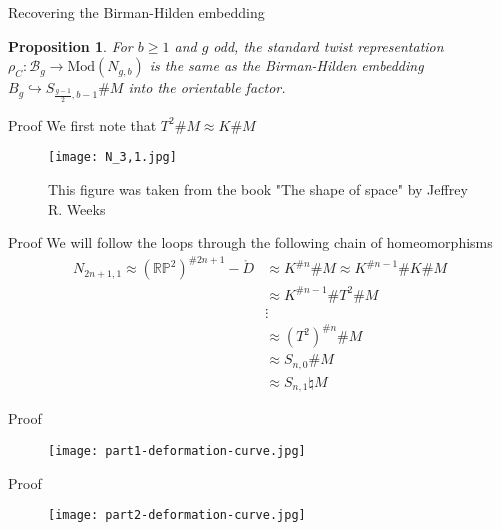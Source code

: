 \documentclass{beamer}
\newtheorem{prop}[thm]{Proposition}
\theoremstyle{definition}
\theoremstyle{remark}
\newcommand{\Mod}{{\mathrm{Mod}}}
\begin{document}
\begin{frame}{Recovering the
Birman-Hilden embedding}
    \begin{prop}
        For $b\geq 1$ and $g$ odd,
        the standard twist representation
        $\rho_C \colon \mathcal{B}_g
        \to \Mod(N_{g,b})$ is the
        same as the Birman-Hilden embedding $B_g \hookrightarrow
        S_{\frac{g-1}{2},b-1} 
        \# M$ into the orientable
        factor.
    \end{prop}
\end{frame}

\begin{frame}{Proof}
    We first note that
    $T^2 \# M \approx
    K \# M$



    \begin{figure}
        \centering
        \texttt{[image: N\_3,1.jpg]}
        \caption{This figure was taken from the book "The shape of space" by Jeffrey R. Weeks}
        \label{fig:enter-label}
    \end{figure}
\end{frame}

\begin{frame}{Proof}
We will follow the loops through
the following chain of
homeomorphisms
    \begin{align*}
N_{2n+1,1} \approx
\left( \mathbb{R}\mathbb{P}^2 \right)^{\# 2n+1} -
\mathring{D} 
&\approx K^{\# n} \# M
\approx K^{\# n-1} \# K \# M\\
&\approx K^{\# n-1} \# T^2 \# M\\
&\vdots\\
&\approx \left( T^2 \right)^{\# n} \# M\\
&\approx S_{n,0} \# M\\
&\approx S_{n,1} \natural M
\end{align*}
\end{frame}

\begin{frame}{Proof}
    \begin{figure}
        \centering
        \texttt{[image: part1-deformation-curve.jpg]}
        \label{fig:enter-label}
    \end{figure}
\end{frame}

\begin{frame}{Proof}
    \begin{figure}
        \centering
        \texttt{[image: part2-deformation-curve.jpg]}
        \label{fig:enter-label}
    \end{figure}
\end{frame}
\end{document}
